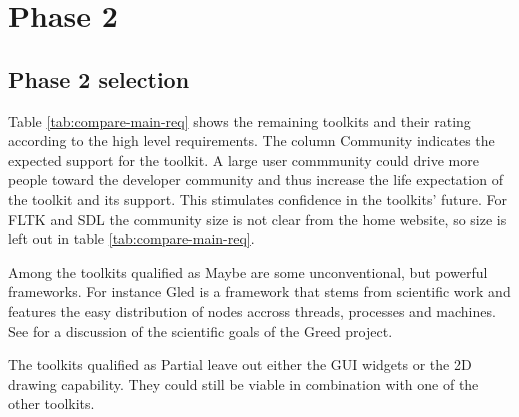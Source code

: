 \section{Phase 2}

\subsection{Phase 2 selection}

Table \ref{tab:compare-main-req} shows the remaining toolkits and their 
rating according to the high level requirements. The column {\sc Community} 
indicates the expected support for the toolkit. A large user 
commmunity could drive more people toward the developer community and thus
increase the life expectation of the toolkit and its support. 
This stimulates confidence in the toolkits' future.
For {\sf FLTK} and {\sf SDL} the community size is not clear from the home website,
so size is left out in table \ref{tab:compare-main-req}.

Among the toolkits qualified as {\sf\sc Maybe} are some unconventional, but
powerful frameworks. For instance {\sc Gled} is a framework that stems from
scientific work and features the easy distribution of nodes accross threads,
processes and machines. See \cite{greed:gled} for a discussion of the scientific
goals of the {\sc\sf Greed} project.


The toolkits qualified as {\sf\sc Partial} leave out either the GUI widgets or 
the 2D drawing capability. They could still be viable in combination with one
of the other toolkits.

